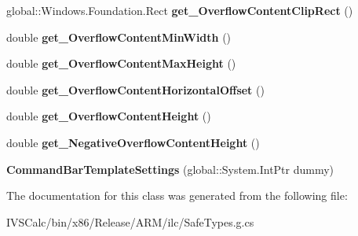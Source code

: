 \begin{DoxyCompactItemize}
global\+::\+Windows.\+Foundation.\+Rect {\bfseries get\+\_\+\+Overflow\+Content\+Clip\+Rect} ()
\item 
\mbox{\label{class_windows_1_1_u_i_1_1_xaml_1_1_controls_1_1_primitives_1_1_command_bar_template_settings_afc65389f4170b245b1b3bd07b68d00f6}} 
double {\bfseries get\+\_\+\+Overflow\+Content\+Min\+Width} ()
\item 
\mbox{\label{class_windows_1_1_u_i_1_1_xaml_1_1_controls_1_1_primitives_1_1_command_bar_template_settings_a8fea8182508357c3bc06e3e0e34da965}} 
double {\bfseries get\+\_\+\+Overflow\+Content\+Max\+Height} ()
\item 
\mbox{\label{class_windows_1_1_u_i_1_1_xaml_1_1_controls_1_1_primitives_1_1_command_bar_template_settings_aa6dafc97e60b0a46a2b1bb1863c8fd16}} 
double {\bfseries get\+\_\+\+Overflow\+Content\+Horizontal\+Offset} ()
\item 
\mbox{\label{class_windows_1_1_u_i_1_1_xaml_1_1_controls_1_1_primitives_1_1_command_bar_template_settings_a7c7a95512223595a9e76eb6c8cd32d6e}} 
double {\bfseries get\+\_\+\+Overflow\+Content\+Height} ()
\item 
\mbox{\label{class_windows_1_1_u_i_1_1_xaml_1_1_controls_1_1_primitives_1_1_command_bar_template_settings_a636edc428ea1a6b8f4101fc7d57694af}} 
double {\bfseries get\+\_\+\+Negative\+Overflow\+Content\+Height} ()
\item 
\mbox{\label{class_windows_1_1_u_i_1_1_xaml_1_1_controls_1_1_primitives_1_1_command_bar_template_settings_a63145ade10baaa86ad4a332419d36756}} 
{\bfseries Command\+Bar\+Template\+Settings} (global\+::\+System.\+Int\+Ptr dummy)
\end{DoxyCompactItemize}


The documentation for this class was generated from the following file\+:\begin{DoxyCompactItemize}
\item 
I\+V\+S\+Calc/bin/x86/\+Release/\+A\+R\+M/ilc/Safe\+Types.\+g.\+cs\end{DoxyCompactItemize}
